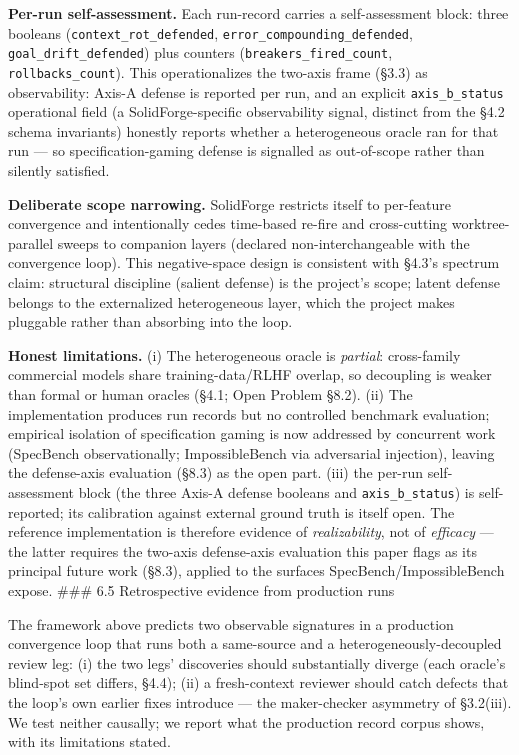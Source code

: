 \documentclass[
  11pt,
]{article}
\begin{document}
\textbf{Per-run self-assessment.} Each run-record carries a
self-assessment block: three booleans (\texttt{context\_rot\_defended},
\texttt{error\_compounding\_defended}, \texttt{goal\_drift\_defended})
plus counters (\texttt{breakers\_fired\_count},
\texttt{rollbacks\_count}). This operationalizes the two-axis frame
(§3.3) as observability: Axis-A defense is reported per run, and an
explicit \texttt{axis\_b\_status} operational field (a
SolidForge-specific observability signal, distinct from the §4.2 schema
invariants) honestly reports whether a heterogeneous oracle ran for that
run --- so specification-gaming defense is signalled as out-of-scope
rather than silently satisfied.

\textbf{Deliberate scope narrowing.} SolidForge restricts itself to
per-feature convergence and intentionally cedes time-based re-fire and
cross-cutting worktree-parallel sweeps to companion layers (declared
non-interchangeable with the convergence loop). This negative-space
design is consistent with §4.3's spectrum claim: structural discipline
(salient defense) is the project's scope; latent defense belongs to the
externalized heterogeneous layer, which the project makes pluggable
rather than absorbing into the loop.

\textbf{Honest limitations.} (i) The heterogeneous oracle is
\emph{partial}: cross-family commercial models share training-data/RLHF
overlap, so decoupling is weaker than formal or human oracles (§4.1;
Open Problem §8.2). (ii) The implementation produces run records but no
controlled benchmark evaluation; empirical isolation of specification
gaming is now addressed by concurrent work (SpecBench observationally;
ImpossibleBench via adversarial injection), leaving the defense-axis
evaluation (§8.3) as the open part. (iii) the per-run self-assessment
block (the three Axis-A defense booleans and \texttt{axis\_b\_status})
is self-reported; its calibration against external ground truth is
itself open. The reference implementation is therefore evidence of
\emph{realizability}, not of \emph{efficacy} --- the latter requires the
two-axis defense-axis evaluation this paper flags as its principal
future work (§8.3), applied to the surfaces SpecBench/ImpossibleBench
expose. \#\#\# 6.5 Retrospective evidence from production runs

The framework above predicts two observable signatures in a production
convergence loop that runs both a same-source and a
heterogeneously-decoupled review leg: (i) the two legs' discoveries
should substantially diverge (each oracle's blind-spot set differs,
§4.4); (ii) a fresh-context reviewer should catch defects that the
loop's own earlier fixes introduce --- the maker-checker asymmetry of
§3.2(iii). We test neither causally; we report what the production
record corpus shows, with its limitations stated.
\end{document}
